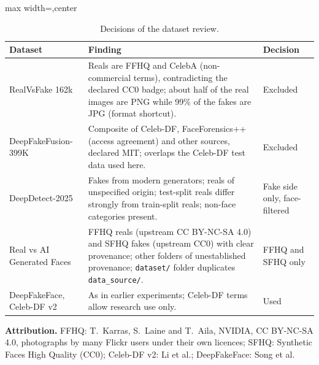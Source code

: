 \begin{table}[H]
\centering
\caption{Decisions of the dataset review.}
\label{tab:licence}
\footnotesize
\begin{adjustbox}{max width=\linewidth,center}
\begin{tabular}{|p{2.6cm}|p{6.8cm}|p{2.2cm}|}
\hline
\textbf{Dataset} & \textbf{Finding} & \textbf{Decision} \\ \hline
RealVsFake 162k & Reals are FFHQ and CelebA (non-commercial terms), contradicting the declared CC0 badge; about half of the real images are PNG while 99\% of the fakes are JPG (format shortcut). & Excluded \\ \hline
DeepFakeFusion-399K & Composite of Celeb-DF, FaceForensics++ (access agreement) and other sources, declared MIT; overlaps the Celeb-DF test data used here. & Excluded \\ \hline
DeepDetect-2025 & Fakes from modern generators; reals of unspecified origin; test-split reals differ strongly from train-split reals; non-face categories present. & Fake side only, face-filtered \\ \hline
Real vs AI Generated Faces & FFHQ reals (upstream CC BY-NC-SA 4.0) and SFHQ fakes (upstream CC0) with clear provenance; other folders of unestablished provenance; \texttt{dataset/} folder duplicates \texttt{data\_source/}. & FFHQ and SFHQ only \\ \hline
DeepFakeFace, Celeb-DF v2 & As in earlier experiments; Celeb-DF terms allow research use only. & Used \\ \hline
\end{tabular}
\end{adjustbox}
\end{table}

\textbf{Attribution.} FFHQ: T.\ Karras, S.\ Laine and T.\ Aila, NVIDIA, CC BY-NC-SA 4.0, photographs by many Flickr users under their own licences;
SFHQ: Synthetic Faces High Quality (CC0); Celeb-DF v2: Li et al.; DeepFakeFace: Song et al.

